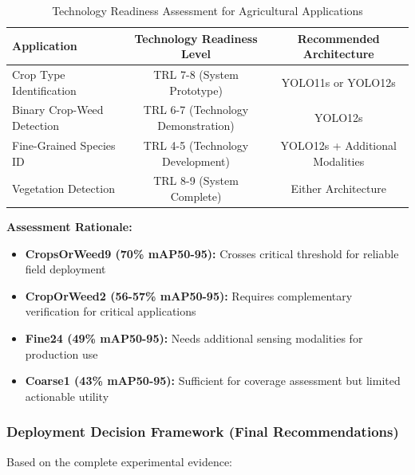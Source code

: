 \begin{table}[htbp]
\centering
\caption{Technology Readiness Assessment for Agricultural Applications}
\label{tab:trl_assessment}
\begin{tabular}{lcc}
\toprule
\textbf{Application} & \textbf{Technology Readiness Level} & \textbf{Recommended Architecture} \\
\midrule
Crop Type Identification & TRL 7-8 (System Prototype) & YOLO11s or YOLO12s \\
Binary Crop-Weed Detection & TRL 6-7 (Technology Demonstration) & YOLO12s \\
Fine-Grained Species ID & TRL 4-5 (Technology Development) & YOLO12s + Additional Modalities \\
Vegetation Detection & TRL 8-9 (System Complete) & Either Architecture \\
\bottomrule
\end{tabular}
\end{table}

\textbf{Assessment Rationale:}
\begin{itemize}
    \item \textbf{CropsOrWeed9 (70\% mAP50-95):} Crosses critical threshold for reliable field deployment
    \item \textbf{CropOrWeed2 (56-57\% mAP50-95):} Requires complementary verification for critical applications
    \item \textbf{Fine24 (49\% mAP50-95):} Needs additional sensing modalities for production use
    \item \textbf{Coarse1 (43\% mAP50-95):} Sufficient for coverage assessment but limited actionable utility
\end{itemize}

\subsubsection{Deployment Decision Framework (Final Recommendations)}

Based on the complete experimental evidence:

